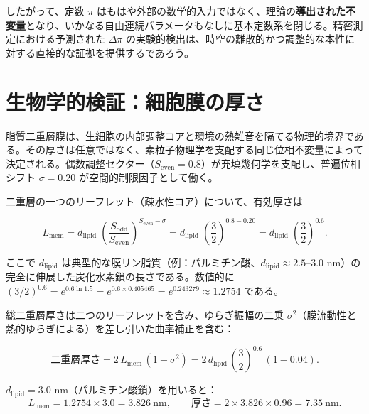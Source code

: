 \documentclass[12pt,a4paper]{article}
\theoremstyle{remark}
\begin{document}
	したがって、定数 \(\pi\) はもはや外部の数学的入力ではなく、理論の\textbf{導出された不変量}となり、いかなる自由連続パラメータもなしに基本定数系を閉じる。精密測定における予測された \(\Delta\pi\) の実験的検出は、時空の離散的かつ調整的な本性に対する直接的な証拠を提供するであろう。
	
	\section{生物学的検証：細胞膜の厚さ}
	\label{sec:bio-membrane}
	
	脂質二重層膜は、生細胞の内部調整コアと環境の熱雑音を隔てる物理的境界である。その厚さは任意ではなく、素粒子物理学を支配する同じ位相不変量によって決定される。偶数調整セクター（\(S_{\mathrm{even}} = 0.8\)）が充填幾何学を支配し、普遍位相シフト \(\sigma = 0.20\) が空間的制限因子として働く。
	
	二重層の一つのリーフレット（疎水性コア）について、有効厚さは
	
	\begin{equation}
		L_{\mathrm{mem}} = d_{\mathrm{lipid}} \;
		\left( \frac{S_{\mathrm{odd}}}{S_{\mathrm{even}}} \right)^{S_{\mathrm{even}} - \sigma}
		= d_{\mathrm{lipid}} \;
		\left( \frac{3}{2} \right)^{0.8 - 0.20}
		= d_{\mathrm{lipid}} \;
		\left( \frac{3}{2} \right)^{0.6}.
	\end{equation}
	
	ここで \(d_{\mathrm{lipid}}\) は典型的な膜リン脂質（例：パルミチン酸、\(d_{\mathrm{lipid}} \approx 2.5\)--\(3.0\) nm）の完全に伸展した炭化水素鎖の長さである。数値的に \((3/2)^{0.6} = e^{0.6\ln 1.5} = e^{0.6 \times 0.405465} = e^{0.243279} \approx 1.2754\) である。
	
	総二重層厚さは二つのリーフレットを含み、ゆらぎ振幅の二乗 \(\sigma^2\)（膜流動性と熱的ゆらぎによる）を差し引いた曲率補正を含む：
	
	\begin{equation}
		\boxed{\text{二重層厚さ} = 2 \, L_{\mathrm{mem}} \,
			(1 - \sigma^2) = 2 \, d_{\mathrm{lipid}} \,
			\left( \frac{3}{2} \right)^{0.6} \, (1 - 0.04)}.
	\end{equation}
	
	\(d_{\mathrm{lipid}} = 3.0\) nm（パルミチン酸鎖）を用いると：
	\[
	L_{\mathrm{mem}} = 1.2754 \times 3.0 = 3.826\ \text{nm},
	\qquad
	\text{厚さ} = 2 \times 3.826 \times 0.96 = 7.35\ \text{nm}.
	\]
	
\end{document}
